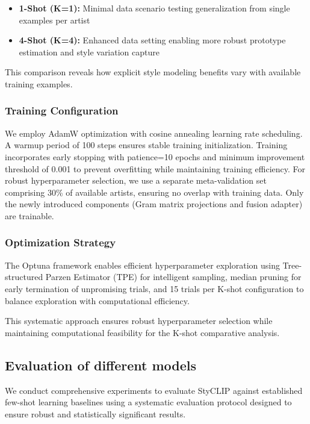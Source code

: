 \documentclass[conference,6pt]{IEEEtran}
\begin{document}
\begin{itemize}
    \item \textbf{1-Shot (K=1):} Minimal data scenario testing generalization from single examples per artist
    \item \textbf{4-Shot (K=4):} Enhanced data setting enabling more robust prototype estimation and style variation capture
\end{itemize}

This comparison reveals how explicit style modeling benefits vary with available training examples.

\subsubsection{Training Configuration}
We employ AdamW optimization with cosine annealing learning rate scheduling. A warmup period of 100 steps ensures stable training initialization. Training incorporates early stopping with patience=10 epochs and minimum improvement threshold of 0.001 to prevent overfitting while maintaining training efficiency. For robust hyperparameter selection, we use a separate meta-validation set comprising 30\% of available artists, ensuring no overlap with training data. Only the newly introduced components (Gram matrix projections and fusion adapter) are trainable. 

\subsubsection{Optimization Strategy}

The Optuna framework enables efficient hyperparameter exploration using Tree-structured Parzen Estimator (TPE) for intelligent sampling, median pruning for early termination of unpromising trials, and 15 trials per K-shot configuration to balance exploration with computational efficiency.

This systematic approach ensures robust hyperparameter selection while maintaining computational feasibility for the K-shot comparative analysis.

\subsection{Evaluation of different models}

We conduct comprehensive experiments to evaluate StyCLIP against established few-shot learning baselines using a systematic evaluation protocol designed to ensure robust and statistically significant results.
\end{document}
